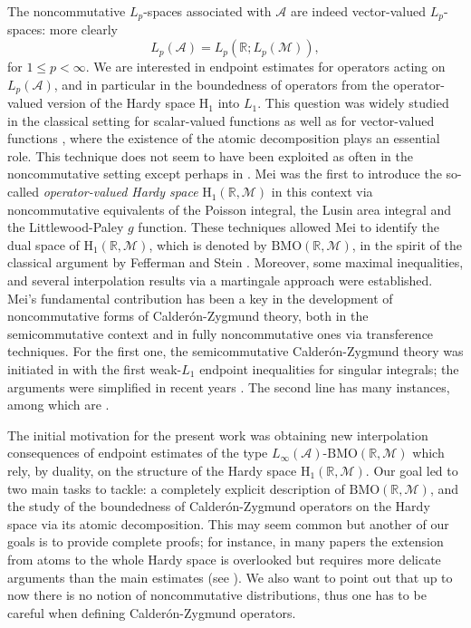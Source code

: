 \documentclass[psamsfonts]{amsart}
\newcommand{\Lp}{L_p}
\newcommand{\Lone}{L_1}
\newcommand{\Linfty}{L_\infty}
\newcommand{\Hone}{\mathrm{H}_1}
\newcommand{\BMO}{\mathrm{BMO}}
\begin{document}
    
 The noncommutative $\Lp$-spaces associated with $\mathcal{A}$ are indeed vector-valued $\Lp$-spaces: more clearly \cite[Chapter 3]{P98}
$$
\Lp(\mathcal{A}) = \Lp(\mathbb{R};\Lp(\mathcal{M})),
$$    
for $1\leq p<\infty$. We are interested in endpoint estimates for
operators acting on $\Lp(\mathcal{A})$, and in particular in the
boundedness of operators from the operator-valued version of the Hardy
space $\Hone$ into $\Lone$. This question was widely studied in the
classical setting for scalar-valued functions \cite{Mey90,MeyC97} as
well as for vector-valued functions \cite{F90,H06}, where the
existence of the atomic decomposition plays an essential role. This
technique does not seem to have been exploited as often in the
noncommutative setting except perhaps in \cite{HLMP14}. Mei \cite{M07} was the first to introduce the
so-called \emph{operator-valued Hardy space}
$\Hone(\mathbb{R},\mathcal{M})$ in this context via noncommutative
equivalents of the Poisson integral, the Lusin area integral and the
Littlewood-Paley $g$ function. These techniques allowed Mei to identify
the dual space of $\Hone(\mathbb{R},\mathcal{M})$, which is denoted by
$\BMO(\mathbb{R},\mathcal{M})$, in the spirit of the classical
argument by Fefferman and Stein \cite{FS72}. Moreover, some maximal
inequalities, and several interpolation results via a martingale
approach were established. Mei's fundamental contribution has been a key
in the development of noncommutative forms of Calder\'on-Zygmund
theory, both in the semicommutative context and in fully
noncommutative ones via transference techniques. For the first one,
the semicommutative Calder\'on-Zygmund theory was initiated in
\cite{P09} with the first weak-$\Lone$ endpoint inequalities
for singular integrals; the arguments  were simplified in recent
years \cite{C18,CCP22}. The second line has many instances, among
which are \cite{GJP21,JMPX21}.
    
The initial motivation for the present work was obtaining new
interpolation consequences of endpoint estimates of the type
$\Linfty(\mathcal{A})$-$\BMO(\mathbb{R},\mathcal{M})$ which rely, by
duality, on the structure of the Hardy space
$\Hone(\mathbb{R},\mathcal{M})$. Our goal led to two main tasks to
tackle: a completely explicit description of
$\BMO(\mathbb{R},\mathcal{M})$, and the study of the boundedness of
Calder\'on-Zygmund operators on the Hardy space via its atomic
decomposition. This may seem common but another of our goals  is to provide complete proofs; for instance, in many papers the extension from atoms to the whole Hardy space is overlooked but requires more delicate arguments than the main estimates  (see \cite{B05}). We also want to point out that up to now there is no notion of noncommutative distributions, thus one has to be careful when defining Calder\'on-Zygmund operators.
\end{document}
